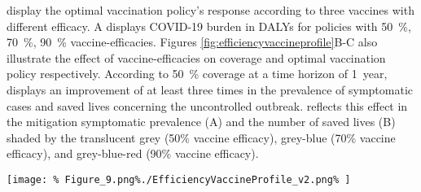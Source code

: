     display the optimal vaccination policy's response  according to three
    vaccines with different efficacy. A
    displays COVID-19 burden in DALYs for policies with
    \SI{50}{\percent},
    \SI{70}{\percent},
    \SI{90}{\percent}
    vaccine-efficacies.
    Figures \ref{fig:efficiencyvaccineprofile}B-C also illustrate the effect
    of vaccine-efficacies on coverage and optimal vaccination policy
    respectively.
    According to \SI{50}{\percent} coverage at a time horizon of
    \SI{1}{year},  displays an
    improvement of at least three times in the prevalence of symptomatic cases
    and saved lives concerning the uncontrolled
    outbreak.  reflects this
    effect in the mitigation
    symptomatic prevalence (A) and
    the number of saved lives (B) shaded by the translucent
    grey (50\% vaccine efficacy), grey-blue (70\% vaccine efficacy), and
    grey-blue-red (90\% vaccine efficacy).
%
%
    \begin{figure*}[htb]
        \centering
        \texttt{[image: \%
            Figure\_9.png\%./EfficiencyVaccineProfile\_v2.png\%
        ]}
        \caption[The response of COVID-19 to vaccine efficacy]{
            The response of COVID-19 burden to vaccine efficacy.
            (A) COVID-19 burden response quantified in DALYs per \SI{100000}{
            inhabitants}  to vaccines with efficacy of
            \SI{50}{\percent} (blue),
            \SI{70}{\percent} (red) and \SI{90}{\percent}(green).
            (B) Coverage evolution to reach \SI{50}{\percent} of the total
            population vaccinated.
            (C) Optimal vaccination doses schedule according to the
            different efficacies. See
            \href{https://plotly.com/~MAAZ/358/}{%
                https://plotly.com/~MAAZ/358/} for
            visualization and data.
        }
        \label{fig:efficiencyvaccineprofile}
    \end{figure*}
%
